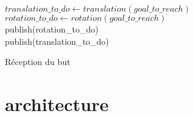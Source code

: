 \documentclass{article}
\begin{document}
\begin{algorithm}[H]
  $translation\_to\_do \gets translation(goal\_to\_reach)$\\
  $rotation\_to\_do \gets rotation(goal\_to\_reach)$\\
  publish(rotation\_to\_do)\\
  publish(translation\_to\_do)\\
  \caption{R\'eception du but}
\end{algorithm}
\section{architecture}

\end{document}
